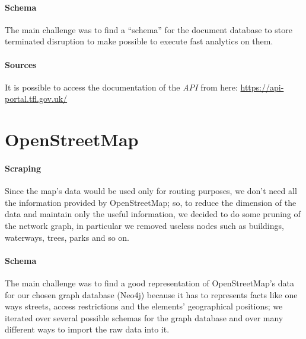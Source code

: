 
\paragraph{Schema}
The main challenge was to find a ``schema'' for the document database to store 
terminated disruption to make possible to execute fast analytics on them.

\paragraph{Sources}
It is possible to access the documentation of the \textit{API} from here: 
\url{https://api-portal.tfl.gov.uk/}

\section{OpenStreetMap}

\paragraph{Scraping}
Since the map’s data would be used only for routing purposes, we don’t need all 
the information provided by OpenStreetMap; so, to reduce the dimension of the 
data and maintain only the useful information, we decided to do some pruning of 
the network graph, in particular we removed useless nodes such as buildings, 
waterways, trees, parks and so on.

\paragraph{Schema}
The main challenge was to find a good representation of OpenStreetMap’s data 
for our chosen graph database (Neo4j) because it has to represents facts like 
one ways streets, access restrictions and the elements' geographical positions; 
we iterated over several possible schemas for the graph database and over many 
different ways to import the raw data into it.

